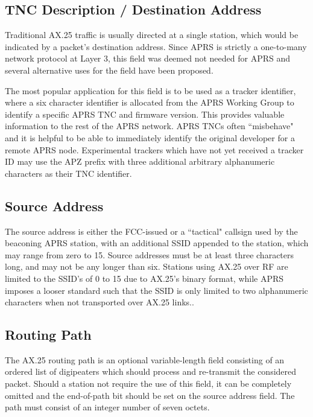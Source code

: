\subsection{TNC Description / Destination Address}

Traditional AX.25 traffic is usually directed at a single station, which would be indicated by 
a packet's destination address. 
Since APRS is strictly a one-to-many network protocol at Layer 3, this field
was deemed not needed for APRS and several alternative uses for the field have been proposed.

The most popular application for this field is to be used as a tracker identifier, where a
six character identifier is allocated from the APRS Working Group to identify a specific 
APRS TNC and firmware version. 
This provides valuable information to the rest of the APRS network.
APRS
TNCs often ``misbehave" and it is helpful to be able to immediately identify the original
developer for a remote APRS node. 
Experimental trackers which have not yet received a tracker ID may use the 
APZ prefix with three additional arbitrary alphanumeric characters as their TNC identifier.

\subsection{Source Address}

The source address is either the FCC-issued or a ``tactical" callsign used by 
the beaconing APRS station, with an 
additional SSID appended to the station, which may range from zero to 15. Source addresses must 
be at least three characters long, and may not be any longer than six. Stations using AX.25 
over RF are limited to the SSID's of 0 to 15 due to AX.25's binary format, 
while APRS imposes a looser standard such that the SSID is only limited to 
two alphanumeric characters when not transported over AX.25 links..

\subsection{Routing Path}
\label{subsec:ax25RoutingPath}

The AX.25 routing path is an optional variable-length field consisting of an ordered list of
digipeaters which should process and re-transmit the considered packet. Should a station not
require the use of this field, it can be completely omitted and the end-of-path bit should be
set on the source address field. The path must consist of an integer number of seven octets.

